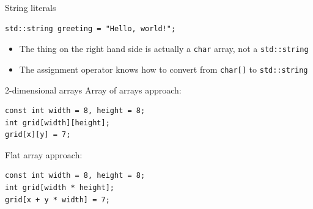 \begin{frame}[fragile]{String literals}
    \begin{lstlisting}
std::string greeting = "Hello, world!";
    \end{lstlisting}
    \begin{itemize}
        \item The thing on the right hand side is actually a \lstinline{char} array, not a \lstinline{std::string}
        \item The assignment operator knows how to convert from \lstinline{char[]} to \lstinline{std::string}
    \end{itemize}
\end{frame}


\begin{frame}[fragile]{2-dimensional arrays}
    Array of arrays approach:
    \begin{lstlisting}
const int width = 8, height = 8;
int grid[width][height];
grid[x][y] = 7;
    \end{lstlisting}
    Flat array approach:
    \begin{lstlisting}
const int width = 8, height = 8;
int grid[width * height];
grid[x + y * width] = 7;
    \end{lstlisting}
\end{frame}

